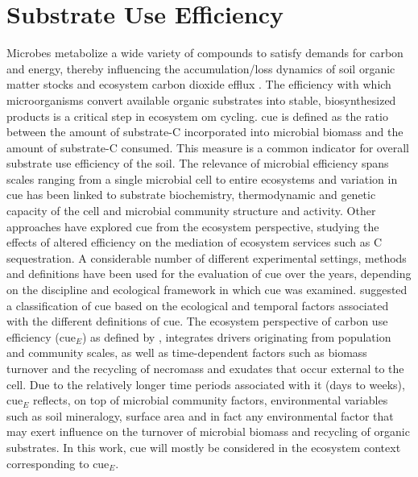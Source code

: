 \documentclass[12pt]{report}
\begin{document}
		\section{Substrate Use Efficiency }
		Microbes metabolize a wide variety of compounds to satisfy demands for \gls{carbon} and energy, thereby influencing the accumulation/loss dynamics of soil organic matter stocks and ecosystem carbon dioxide efflux \citep{xu2017}. The efficiency with which microorganisms convert available organic substrates into stable, biosynthesized products is a critical step in ecosystem \gls{om} cycling. \gls{cue} is defined as the ratio between the amount of substrate-C incorporated into microbial biomass and the amount of substrate-C consumed. This measure is a common indicator for overall substrate use efficiency of the soil. The relevance of microbial efficiency spans scales ranging from a single microbial cell to entire ecosystems and variation in \gls{cue} has been linked to substrate biochemistry, thermodynamic and genetic capacity of the cell and microbial community structure and activity\citep{kallenbach2019, soares2019}. Other approaches have explored \gls{cue} from the ecosystem perspective, studying the effects of altered efficiency on the mediation of ecosystem services such as C sequestration. A considerable number of different experimental settings, methods and definitions have been used for the evaluation of \gls{cue} over the years, depending on the discipline and ecological framework in which \gls{cue} was examined. \citet{geyer2016} suggested a classification of \gls{cue} based on the ecological and temporal factors associated with the different definitions of \gls{cue}. The ecosystem perspective of carbon use efficiency (\gls{cue}$ _E $) as defined by \citet{geyer2016}, integrates drivers originating from population and community scales, as well as time-dependent factors such as biomass turnover and the recycling of necromass and exudates that occur external to the cell. Due to the relatively longer time periods associated with it (days to weeks), \gls{cue}$ _E $ reflects, on top of microbial community factors, environmental variables such as soil mineralogy, surface area and in fact any environmental factor that may exert influence on the turnover of microbial biomass and recycling of organic substrates. In this work, \gls{cue} will mostly be considered in the ecosystem context corresponding to \gls{cue}$ _E $.\\
\end{document}
